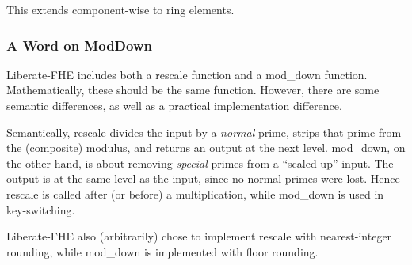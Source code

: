 \documentclass[../keyswitching.tex]{subfiles}
\begin{document}
This extends component-wise to ring elements.

\subsubsection{A Word on ModDown}
Liberate-FHE includes both a \textrm{rescale} function and a \textrm{mod\_down} function. Mathematically, these should be the same function. However, there are some semantic differences, as well as a practical implementation difference. 

Semantically, \textrm{rescale} divides the input by a \emph{normal} prime, strips that prime from the (composite) modulus, and returns an output at the next level. \textrm{mod\_down}, on the other hand, is about removing \emph{special} primes from a ``scaled-up'' input. The output is at the same level as the input, since no normal primes were lost. Hence \textrm{rescale} is called after (or before) a multiplication, while \textrm{mod\_down} is used in key-switching.

Liberate-FHE also (arbitrarily) chose to implement \textrm{rescale} with nearest-integer rounding, while \textrm{mod\_down} is implemented with \textrm{floor} rounding.

\ifcompileasbook
\else
\printbibliography
\fi
\end{document}
